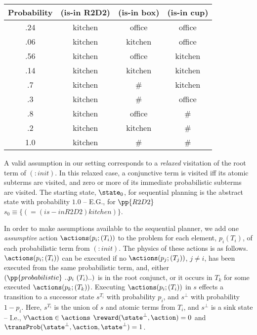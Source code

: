 \small
\begin{tabular}{cccc}
\hline
Probability & (is-in R2D2)  & (is-in box)  & (is-in cup) \\
\hline
.24 & kitchen & office & office \\
.06 & kitchen & kitchen & office \\
.56 & kitchen & office & kitchen \\
.14 & kitchen & kitchen & kitchen \\
.7 & kitchen & \# &  kitchen\\
.3 & kitchen & \# & office \\
.8 & kitchen & office & \# \\
.2 & kitchen & kitchen & \# \\
1.0 & kitchen & \# & \# \\
\hline
\end{tabular}
\normalsize

\noindent A valid assumption in our setting corresponds to a {\em
relaxed} visitation of the root term of $(:init)$. In this relaxed
case, a conjunctive term is visited iff its atomic subterms are
visited, and zero or more of its immediate probabilistic subterms are
visited. The starting state, $\state_0$, for sequential planning is
the abstract state with probability $1.0$ -- E.G., for $\pp{R2D2}$
$s_0 \equiv \{(= (is-in R2D2) kitchen)\}$.

In order to make assumptions available to the sequential planner, we
add one {\em assumptive} action $\actions(p_i;(T_i))$ to the problem
for each element, $p_i (T_i)$, of each probabilistic term from
$(:init)$. The physics of these actions is as
follows. $\actions(p_i;(T_i))$ can be executed if no
$\actions(p_j;(T_j))$, $j \neq i$, has been executed from the same
probabilistic term, and, either $(\pp{probabilistic}~..p_i~(T_i)..)$
is in the root conjunct, or it occurs in $T_k$ for some executed
$\actions(p_k;(T_k))$.
Executing $\actions(p_i;(T_i))$ in $s$ effects a transition to a
successor state $s^{T_i}$ with probability $p_i$, and $s^\bot$ with
probability $1 - p_i$. Here, $s^{T_i}$ is the union of $s$ and atomic
terms from $T_i$, and $s^\bot$ is a sink state -- I.e.,
$\forall\action\in\actions$ $\reward(\state^\bot, \action) = 0$ and
$\transProb(\state^\bot, \action, \state^\bot) = 1$.

